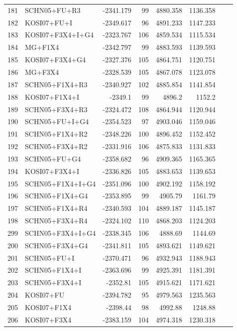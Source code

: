 \begin{longtable}{clrrrrrr}
	181 & SCHN05+FU+R3 & -2341.179 & 99 & 4880.358 & 1136.358 \\ 
	182 & KOSI07+FU+I & -2349.617 & 96 & 4891.233 & 1147.233 \\ 
	183 & KOSI07+F3X4+I+G4 & -2323.767 & 106 & 4859.534 & 1115.534 \\ 
	184 & MG+F1X4 & -2342.797 & 99 & 4883.593 & 1139.593 & \\ 
	185 & KOSI07+F3X4+G4 & -2327.376 & 105 & 4864.751 & 1120.751 \\ 
	186 & MG+F3X4 & -2328.539 & 105 & 4867.078 & 1123.078 \\ 
	187 & SCHN05+F1X4+R3 & -2340.927 & 102 & 4885.854 & 1141.854 \\ 
	188 & KOSI07+F1X4+I & -2349.1 & 99 & 4896.2 & 1152.2 & \\ 
	189 & SCHN05+F3X4+R3 & -2324.472 & 108 & 4864.944 & 1120.944 \\ 
	190 & SCHN05+FU+I+G4 & -2354.523 & 97 & 4903.046 & 1159.046 \\ 
	191 & SCHN05+F1X4+R2 & -2348.226 & 100 & 4896.452 & 1152.452 \\ 
	192 & SCHN05+F3X4+R2 & -2331.916 & 106 & 4875.833 & 1131.833 \\ 
	193 & SCHN05+FU+G4 & -2358.682 & 96 & 4909.365 & 1165.365 \\ 
	194 & KOSI07+F3X4+I & -2336.826 & 105 & 4883.653 & 1139.653 \\ 
	195 & SCHN05+F1X4+I+G4 & -2351.096 & 100 & 4902.192 & 1158.192 \\ 
	196 & SCHN05+F1X4+G4 & -2353.895 & 99 & 4905.79 & 1161.79 \\ 
	197 & SCHN05+F1X4+R4 & -2340.593 & 104 & 4889.187 & 1145.187 \\ 
	198 & SCHN05+F3X4+R4 & -2324.102 & 110 & 4868.203 & 1124.203 \\ 
	299 & SCHN05+F3X4+I+G4 & -2338.345 & 106 & 4888.69 & 1144.69 \\ 
	200 & SCHN05+F3X4+G4 & -2341.811 & 105 & 4893.621 & 1149.621 \\ 
	201 & SCHN05+FU+I & -2370.471 & 96 & 4932.943 & 1188.943 \\ 
	202 & SCHN05+F1X4+I & -2363.696 & 99 & 4925.391 & 1181.391 \\ 
	203 & SCHN05+F3X4+I & -2352.81 & 105 & 4915.621 & 1171.621 \\ 
	204 & KOSI07+FU & -2394.782 & 95 & 4979.563 & 1235.563 \\ 
	205 & KOSI07+F1X4 & -2398.44 & 98 & 4992.88 & 1248.88 \\ 
	206 & KOSI07+F3X4 & -2383.159 & 104 & 4974.318 & 1230.318 \\ 

\end{longtable}
